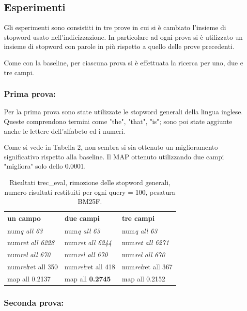 \documentclass[runningheads]{llncs}
\begin{document}
\subsection{Esperimenti}

Gli esperimenti sono consistiti in tre prove in cui si \`e cambiato l'insieme di stopword usato nell'indicizzazione. In particolare ad ogni prova si \`e utilizzato un insieme di stopword con parole in pi\`u rispetto a quello delle prove precedenti.

Come con la baseline, per ciascuna prova si \`e effettuata la ricerca per uno, due e tre campi.

\subsubsection{Prima prova:}

Per la prima prova sono state utilizzate le stopword generali della lingua inglese. Queste comprendono termini come "the", "that", "is"; sono poi state aggiunte anche le lettere dell'alfabeto ed i numeri.

Come si vede in Tabella 2, non sembra si sia ottenuto un miglioramento significativo rispetto alla baseline. Il MAP ottenuto utilizzando due campi "migliora" solo dello 0.0001.
\begin{table}
\centering
\begin{tabular}{lll}
\hline
\textbf{ un campo }           & \textbf{ due campi }           & \textbf{ tre campi }            \\ \hline
 num\textit{q all 63 }       &  num\textit{q all 63 }       &  num\textit{q all 63 }        \\
 num\textit{ret all 6228 }  &  num\textit{ret all 6244 }  &  num\textit{ret all 6271 }   \\
 num\textit{rel all 670 }    &  num\textit{rel all 670 }    &  num\textit{rel all 670 }     \\
 num\textit{rel}ret all 350  &  num\textit{rel}ret all 418  &  num\textit{rel}ret all 367   \\
map all 0.2137               & map all \bf 0.2745               & map all 0.2152          \\ \hline
\end{tabular}

\caption{ Risultati trec\_eval, rimozione delle stopword generali, numero risultati restituiti per ogni query = 100, pesatura BM25F.}
\end{table}

\subsubsection{Seconda prova:}
\end{document}

